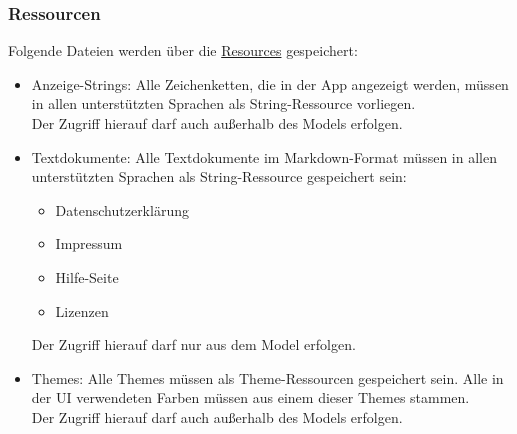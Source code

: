 \subsubsection{Ressourcen}
Folgende Dateien werden über die \href{https://developer.android.com/reference/android/content/res/Resources}{Resources} gespeichert:
\begin{itemize}
    \item Anzeige-Strings: Alle Zeichenketten, die in der App angezeigt werden, 
    müssen in allen unterstützten Sprachen als String-Ressource vorliegen.\\
    Der Zugriff hierauf darf auch außerhalb des Models erfolgen.
    \item Textdokumente: Alle Textdokumente im Markdown-Format müssen in allen unterstützten 
    Sprachen als String-Ressource gespeichert sein:\\
    \begin{itemize}
        \item Datenschutzerklärung
        \item Impressum
        \item Hilfe-Seite
        \item Lizenzen
    \end{itemize}
    Der Zugriff hierauf darf nur aus dem Model erfolgen.
    \item Themes: Alle Themes müssen als Theme-Ressourcen gespeichert sein. 
    Alle in der UI verwendeten Farben müssen aus einem dieser Themes stammen.\\
    Der Zugriff hierauf darf auch außerhalb des Models erfolgen.
\end{itemize}